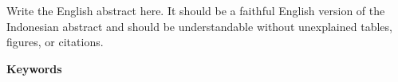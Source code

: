 
\begin{center}
  {\bfseries \cetakJudulInggris}
\end{center}


Write the English abstract here. It should be a faithful English version of the Indonesian abstract and should be understandable without unexplained tables, figures, or citations.

\vspace{6mm}
\noindent\textbf{Keywords}\par
\noindent \keywords
